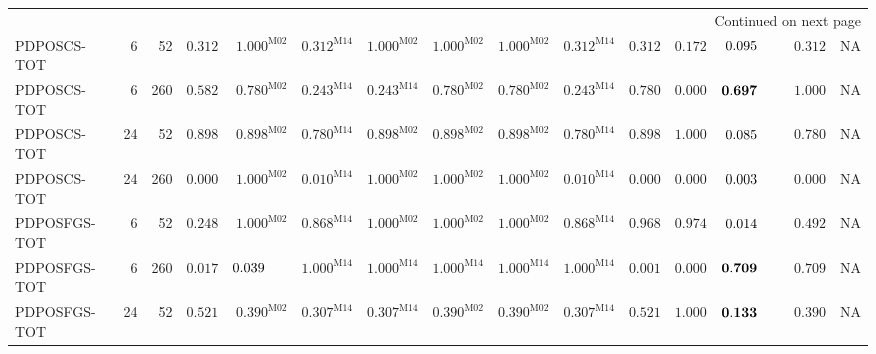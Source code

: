 \begin{longtable}{@{}lrrrrrrrrrrrrrr@{}}
\midrule
\endhead
\midrule\multicolumn{15}{r}{Continued on next page}\\\endfoot
\bottomrule\endlastfoot
PDPOSCS-TOT & 6 & 52 & $\mathbf{0.312}$ & $\mathbf{1.000}^{\mathrm{M02}}$ & $\mathbf{0.312}^{\mathrm{M14}}$ & $\mathbf{1.000}^{\mathrm{M02}}$ & $\mathbf{1.000}^{\mathrm{M02}}$ & $\mathbf{1.000}^{\mathrm{M02}}$ & $\mathbf{0.312}^{\mathrm{M14}}$ & $\mathbf{0.312}$ & $\mathbf{0.172}$ & $0.095\hphantom{^{\mathrm{M00}}}$ & $\mathbf{0.312}$ & \textsc{NA} \\
PDPOSCS-TOT & 6 & 260 & $\mathbf{0.582}$ & $\mathbf{0.780}^{\mathrm{M02}}$ & $\mathbf{0.243}^{\mathrm{M14}}$ & $\mathbf{0.243}^{\mathrm{M14}}$ & $\mathbf{0.780}^{\mathrm{M02}}$ & $\mathbf{0.780}^{\mathrm{M02}}$ & $\mathbf{0.243}^{\mathrm{M14}}$ & $\mathbf{0.780}$ & $0.000$ & $\mathbf{0.697}\hphantom{^{\mathrm{M00}}}$ & $\mathbf{1.000}$ & \textsc{NA} \\
PDPOSCS-TOT & 24 & 52 & $\mathbf{0.898}$ & $\mathbf{0.898}^{\mathrm{M02}}$ & $\mathbf{0.780}^{\mathrm{M14}}$ & $\mathbf{0.898}^{\mathrm{M02}}$ & $\mathbf{0.898}^{\mathrm{M02}}$ & $\mathbf{0.898}^{\mathrm{M02}}$ & $\mathbf{0.780}^{\mathrm{M14}}$ & $\mathbf{0.898}$ & $\mathbf{1.000}$ & $0.085\hphantom{^{\mathrm{M00}}}$ & $\mathbf{0.780}$ & \textsc{NA} \\
PDPOSCS-TOT & 24 & 260 & $0.000$ & $\mathbf{1.000}^{\mathrm{M02}}$ & $0.010^{\mathrm{M14}}$ & $\mathbf{1.000}^{\mathrm{M02}}$ & $\mathbf{1.000}^{\mathrm{M02}}$ & $\mathbf{1.000}^{\mathrm{M02}}$ & $0.010^{\mathrm{M14}}$ & $0.000$ & $0.000$ & $0.003\hphantom{^{\mathrm{M00}}}$ & $0.000$ & \textsc{NA} \\
PDPOSFGS-TOT & 6 & 52 & $\mathbf{0.248}$ & $\mathbf{1.000}^{\mathrm{M02}}$ & $\mathbf{0.868}^{\mathrm{M14}}$ & $\mathbf{1.000}^{\mathrm{M02}}$ & $\mathbf{1.000}^{\mathrm{M02}}$ & $\mathbf{1.000}^{\mathrm{M02}}$ & $\mathbf{0.868}^{\mathrm{M14}}$ & $\mathbf{0.968}$ & $\mathbf{0.974}$ & $0.014\hphantom{^{\mathrm{M00}}}$ & $\mathbf{0.492}$ & \textsc{NA} \\
PDPOSFGS-TOT & 6 & 260 & $0.017$ & $0.039\hphantom{^{\mathrm{M00}}}$ & $\mathbf{1.000}^{\mathrm{M14}}$ & $\mathbf{1.000}^{\mathrm{M14}}$ & $\mathbf{1.000}^{\mathrm{M14}}$ & $\mathbf{1.000}^{\mathrm{M14}}$ & $\mathbf{1.000}^{\mathrm{M14}}$ & $0.001$ & $0.000$ & $\mathbf{0.709}\hphantom{^{\mathrm{M00}}}$ & $\mathbf{0.709}$ & \textsc{NA} \\
PDPOSFGS-TOT & 24 & 52 & $\mathbf{0.521}$ & $\mathbf{0.390}^{\mathrm{M02}}$ & $\mathbf{0.307}^{\mathrm{M14}}$ & $\mathbf{0.307}^{\mathrm{M14}}$ & $\mathbf{0.390}^{\mathrm{M02}}$ & $\mathbf{0.390}^{\mathrm{M02}}$ & $\mathbf{0.307}^{\mathrm{M14}}$ & $\mathbf{0.521}$ & $\mathbf{1.000}$ & $\mathbf{0.133}\hphantom{^{\mathrm{M00}}}$ & $\mathbf{0.390}$ & \textsc{NA} \\

\end{longtable}
